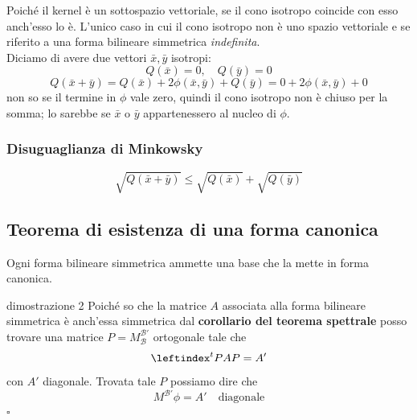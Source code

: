 \documentclass[x11names]{article}
\newcommand*{\QEDB}{\null\nobreak\hfill\ensuremath{\square}}%
\begin{document}
\noindent
Poiché il kernel è un sottospazio vettoriale, se il cono isotropo coincide con esso anch'esso lo è. L'unico caso in cui il cono isotropo non è uno spazio vettoriale e se riferito a una forma bilineare simmetrica \textit{indefinita}.\\

\noindent
Diciamo di avere due vettori $\bar{x},\bar{y}$ isotropi:
\[
Q(\bar{x}) = 0, \quad Q(\bar{y}) = 0
\]
\[
Q(\bar{x} + \bar{y}) = Q(\bar{x}) + 2 \phi(\bar{x},\bar{y}) + Q(\bar{y}) = 0 + 2 \phi(\bar{x},\bar{y}) + 0
\]
non so se il termine in $\phi$ vale zero, quindi il cono isotropo non è chiuso per la somma; lo sarebbe se $\bar{x}$ o $\bar{y}$ appartenessero al nucleo di $\phi$.

\begin{center}
	\colorbox{myred}{\begin{minipage}{5.75in}
			\begin{redes}{}
				\subsubsection{Disuguaglianza di Minkowsky}
				\[
				\sqrt{Q(\bar{x}+\bar{y})} \leq \sqrt{Q(\bar{x})} + \sqrt{Q(\bar{y})}
				\]
			\end{redes}
	\end{minipage}}        
\end{center}
 
 \begin{center}
 	\colorbox{myred}{\begin{minipage}{5.75in}
 			\begin{redes}{}
 				\subsection{Teorema di esistenza di una forma canonica}
 				Ogni forma bilineare simmetrica ammette una base che la mette in forma canonica.
 			\end{redes}
 	\end{minipage}}        
 \end{center}
\begin{es}{dimostrazione 2}
	Poiché so che la matrice $A$ associata alla forma bilineare simmetrica è anch'essa simmetrica dal \textbf{corollario del teorema spettrale} posso trovare una matrice $P = M^{\mathcal{B'}}_{\mathcal{B}}$ ortogonale tale che 
	\[
	\leftindex^{t}{P}AP = A' 
	\]
	con $A'$ diagonale. Trovata tale $P$ possiamo dire che 
	\[
	M^{\mathcal{B'}}\phi = A' \quad \text{diagonale}
	\] \QEDB
\end{es}
\end{document}
